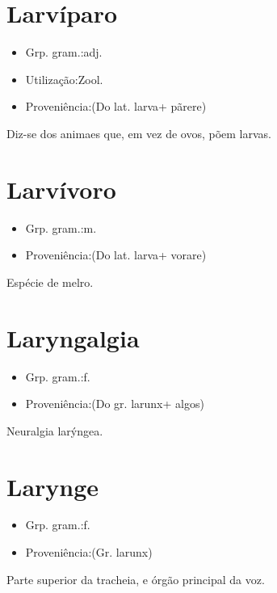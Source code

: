 \section{Larvíparo}
\begin{itemize}
\item {Grp. gram.:adj.}
\end{itemize}
\begin{itemize}
\item {Utilização:Zool.}
\end{itemize}
\begin{itemize}
\item {Proveniência:(Do lat. \textunderscore larva\textunderscore  + \textunderscore pãrere\textunderscore )}
\end{itemize}
Diz-se dos animaes que, em vez de ovos, põem larvas.
\section{Larvívoro}
\begin{itemize}
\item {Grp. gram.:m.}
\end{itemize}
\begin{itemize}
\item {Proveniência:(Do lat. \textunderscore larva\textunderscore  + \textunderscore vorare\textunderscore )}
\end{itemize}
Espécie de melro.
\section{Laryngalgia}
\begin{itemize}
\item {Grp. gram.:f.}
\end{itemize}
\begin{itemize}
\item {Proveniência:(Do gr. \textunderscore larunx\textunderscore  + \textunderscore algos\textunderscore )}
\end{itemize}
Neuralgia larýngea.
\section{Larynge}
\begin{itemize}
\item {Grp. gram.:f.}
\end{itemize}
\begin{itemize}
\item {Proveniência:(Gr. \textunderscore larunx\textunderscore )}
\end{itemize}
Parte superior da tracheia, e órgão principal da voz.
